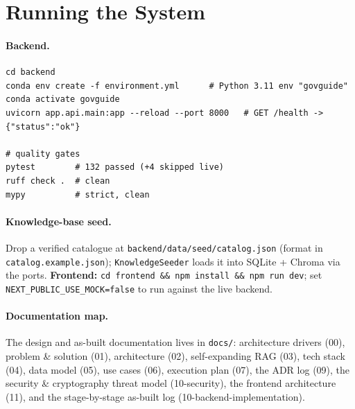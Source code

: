 \documentclass[11pt,a4paper]{article}
\begin{document}
\appendix
\section{Running the System}
\label{app:run}

\paragraph{Backend.}
\begin{lstlisting}[language={}]
cd backend
conda env create -f environment.yml      # Python 3.11 env "govguide"
conda activate govguide
uvicorn app.api.main:app --reload --port 8000   # GET /health -> {"status":"ok"}

# quality gates
pytest        # 132 passed (+4 skipped live)
ruff check .  # clean
mypy          # strict, clean
\end{lstlisting}

\paragraph{Knowledge-base seed.} Drop a verified catalogue at \texttt{backend/data/seed/catalog.json}
(format in \texttt{catalog.example.json}); \texttt{KnowledgeSeeder} loads it into SQLite + Chroma via
the ports. \textbf{Frontend:} \texttt{cd frontend \&\& npm install \&\& npm run dev}; set
\texttt{NEXT\_PUBLIC\_USE\_MOCK=false} to run against the live backend.

\paragraph{Documentation map.} The design and as-built documentation lives in \texttt{docs/}:
architecture drivers (00), problem \& solution (01), architecture (02), self-expanding RAG (03), tech
stack (04), data model (05), use cases (06), execution plan (07), the ADR log (09), the security \&
cryptography threat model (10-security), the frontend architecture (11), and the stage-by-stage
as-built log (10-backend-implementation).
\end{document}
